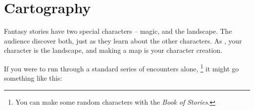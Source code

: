 \chapter[The Cartographers]{Cartography}
\label{civilization}
\label{makingTheMap}


Fantasy stories have two special characters -- magic, and the landscape.
The audience discover both, just as they learn about the other characters.
As , your character is the landscape, and making a map is your character creation.

If you were to run through a standard series of encounters alone,%
\footnote{You can make some random characters with the \textit{Book of Stories}.}
it might go something like this:


